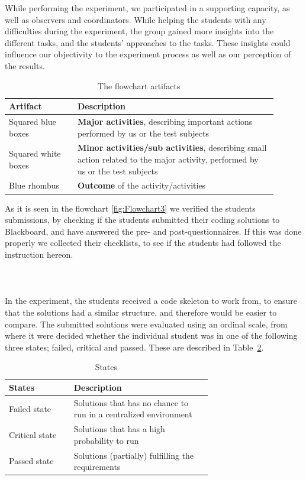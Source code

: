 \documentclass{sig-alternate-05-2015}
\begin{document}
While performing the experiment, we participated in a supporting capacity, as well as observers and coordinators. While helping the students with any difficulties during the experiment, the group gained more insights into the different tasks, and the students' approaches to the tasks. These insights could influence our objectivity to the experiment process as well as our perception of the results.\\
\begin{table}[!ht]
\centering
\caption{The flowchart artifacts}
\label{tab:The flowchart artifacts:}
\begin{tabular}{|p{0.23\linewidth}|p{0.67\linewidth}|}
\hline
\textbf{Artifact} & \textbf{Description} \\
\hline
\hline
Squared blue boxes & \textbf{Major activities}, describing important actions performed by us or the test subjects\\
Squared white boxes & \textbf{Minor activities/sub activities}, describing small action related to the major activity, performed by us or the test subjects\\
Blue rhombus & \textbf{Outcome} of the activity/activities\\
\hline
\end{tabular}
\end{table}

As it is seen in the flowchart \ref{fig:Flowchart3} we verified the students submissions, by checking if the students submitted their coding solutions to Blackboard, and have answered the pre- and post-questionnaires. If this was done properly we collected their checklists, to see if the students had followed the instruction hereon.\\\\\\\\

In the experiment, the students received a code skeleton to work from, to ensure that the solutions had a similar structure, and therefore would be easier to compare. The submitted solutions were evaluated using an ordinal scale, from where it were decided whether the individual student was in one of the following three states; failed, critical and passed. These are described in Table~\ref{StatesTable}.

\begin{table}[!ht]
\centering
\caption{States}
\label{StatesTable}
\begin{tabular}{|l|p{0.68\linewidth}|}
\hline
\textbf{States} & \textbf{Description} \\
\hline
\hline
Failed state & Solutions that has no chance to run in a centralized environment \\
Critical state & Solutions that has a high probability to run \\
Passed state & Solutions (partially) fulfilling the requirements \\
\hline
\end{tabular}
\end{table}
\end{document}
